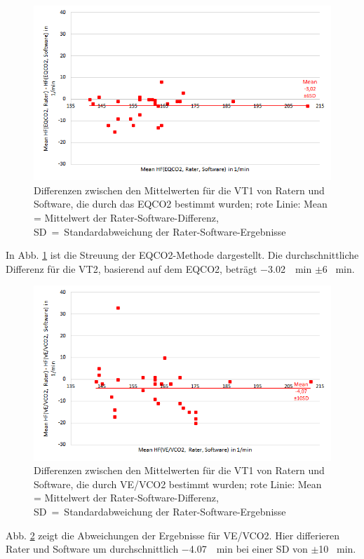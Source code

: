 \begin{figure}[H]
	\centering
	\includegraphics[scale=0.7]{Bilder/mean_eqco2}
	\caption[Differenzen der \gls{EQCO2}-Ergebnisse zwischen Ratern und Software]{Differenzen zwischen den Mittelwerten für die VT1 von Ratern und Software, die durch das \gls{EQCO2} bestimmt wurden; rote Linie: Mean = Mittelwert der Rater-Software-Differenz, SD~=~Standardabweichung der Rater-Software-Ergebnisse}
	\label{pic:pic26}
\end{figure}
%
In Abb. \ref{pic:pic26} ist die Streuung der \gls{EQCO2}-Methode dargestellt. Die durchschnittliche Differenz für die VT2, basierend auf dem \gls{EQCO2}, beträgt \SI{-3,02}{\per\minute} $\pm$6 \si{\per\minute}.
%
\begin{figure}[H]
	\centering
	\includegraphics[scale=0.7]{Bilder/mean_vevco2}
	\caption[Differenzen der \gls{VE}/\gls{VCO2}-Ergebnisse zwischen Ratern und Software]{Differenzen zwischen den Mittelwerten für die VT1 von Ratern und Software, die durch \gls{VE}/\gls{VCO2} bestimmt wurden; rote Linie: Mean = Mittelwert der Rater-Software-Differenz, SD~=~Standardabweichung der Rater-Software-Ergebnisse}
	\label{pic:pic27}
\end{figure}
%
Abb. \ref{pic:pic27} zeigt die Abweichungen der Ergebnisse für \gls{VE}/\gls{VCO2}. Hier differieren Rater und Software um durchschnittlich \SI{-4,07}{\per\minute} bei einer \gls{SD} von $\pm$10 \si{\per\minute}.